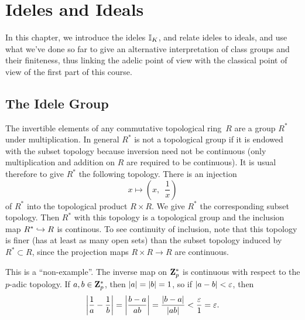 \chapter{Ideles and Ideals}
In this chapter, we introduce the ideles $\mathbb{I}_K$, and relate ideles to
ideals, and use what we've done so far to give an alternative
interpretation of class groups and their finiteness, thus linking the
adelic point of view with the classical point of view of the first
part of this course.



\section{The Idele Group}
The invertible elements of any commutative
topological ring~$R$ are a group $R^*$ under multiplication.
In general $R^*$ is not a topological group if it is
endowed with the subset topology because inversion need
not be continuous (only multiplication and addition on 
$R$ are required to be continuous).  It is usual therefore
to give $R^*$ the following topology.
There is an injection 
\begin{equation}\label{eqn:prod_embed}
  x\mapsto \left( x, \,\,\,\frac{1}{x} \right)
\end{equation}
of $R^*$ into the topological product $R\times R$.  We give $R^*$ the
corresponding subset topology.  Then $R^*$ with this topology is a
topological group and the inclusion map $R^*\hookrightarrow R$ is continous.  To
see continuity of inclusion, note that this topology is finer (has at
least as many open sets) than the subset topology induced by
$R^*\subset R$, since the projection maps $R\times R\to R$ are
continuous.

\begin{example}\label{ex:cont}
This is a ``non-example''. The inverse map on $\mathbf{Z}_p^*$ is continuous with
respect to the $p$-adic topology.  If $a,b\in \mathbf{Z}_p^*$,
then $\left|a\right|=\left|b\right|=1$, so if $\left|a-b\right|<\varepsilon$, then
$$
  \left|\frac{1}{a} - \frac{1}{b}\right|
   = \left|\frac{b-a}{ab}\right| = \frac{\left|b-a\right|}{\left|ab\right|} < \frac{\varepsilon}{1}=\varepsilon.
$$
\end{example}

